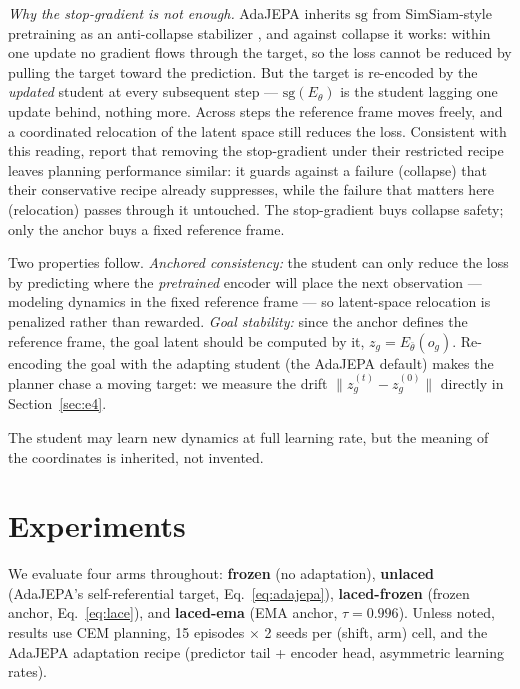 \documentclass{article}
\newcommand{\sg}{\mathrm{sg}}
\newcommand{\Estud}{E_{\theta}}
\newcommand{\Efroz}{E_{\bar\theta}}
\begin{document}
\emph{Why the stop-gradient is not enough.} AdaJEPA inherits $\sg$ from
SimSiam-style pretraining as an anti-collapse stabilizer
\citep{chen2021simsiam}, and against collapse it works: within one update no
gradient flows through the target, so the loss cannot be reduced by pulling
the target toward the prediction. But the target is re-encoded by the
\emph{updated} student at every subsequent step --- $\sg(\Estud)$ is the
student lagging one update behind, nothing more. Across steps the reference
frame moves freely, and a coordinated relocation of the latent space still
reduces the loss. Consistent with this reading,
\citet{anonymous2026adajepa} report that removing the stop-gradient under
their restricted recipe leaves planning performance similar: it guards
against a failure (collapse) that their conservative recipe already
suppresses, while the failure that matters here (relocation) passes through
it untouched. The stop-gradient buys collapse safety; only the anchor buys a
fixed reference frame.

Two properties follow. \emph{Anchored consistency:} the student can only
reduce the loss by predicting where the \emph{pretrained} encoder will place
the next observation --- modeling dynamics in the fixed reference frame ---
so latent-space relocation is penalized rather than rewarded.
\emph{Goal stability:} since the anchor defines the reference frame, the goal
latent should be computed by it, $z_g = \Efroz(o_g)$. Re-encoding the goal
with the adapting student (the AdaJEPA default) makes the planner chase a
moving target: we measure the drift
$\lVert z_g^{(t)} - z_g^{(0)} \rVert$ directly in Section~\ref{sec:e4}.

The student may learn new dynamics at full learning rate, but the meaning of
the coordinates is inherited, not invented.

\section{Experiments}
\label{sec:experiments}


We evaluate four arms throughout: \textbf{frozen} (no adaptation),
\textbf{unlaced} (AdaJEPA's self-referential target,
Eq.~\ref{eq:adajepa}), \textbf{laced-frozen} (frozen anchor,
Eq.~\ref{eq:lace}), and \textbf{laced-ema} (EMA anchor, $\tau{=}0.996$).
Unless noted, results use CEM planning, 15 episodes $\times$ 2 seeds per
(shift, arm) cell, and the AdaJEPA adaptation recipe (predictor tail +
encoder head, asymmetric learning rates).
\end{document}
